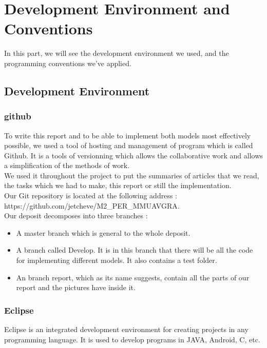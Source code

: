 \chapter{Development Environment and Conventions}

In this part, we will see the development environment we used, and the programming conventions we've applied.

\section{Development Environment}

\subsection{github}

To write this report and to be able to implement both models most effectively possible, we used a tool of hosting and management of program which is called Github. It is a tools of versionning which allows the collaborative work and allows a simplification of the methods of work.\\
We used it throughout the project to put the summaries of articles that we read, the tasks which we had to make, this report or still the implementation.\\
Our Git repository is located at the following address : \\
https://github.com/jetcheve/M2\_PER\_MMUAVGRA.\\

Our deposit decomposes into three branches :

\begin{itemize}
\item A master branch which is general to the whole deposit.
\item A branch called Develop. It is in this branch that there will be all the code for implementing different models. It also contains a test folder. 
\item An branch report, which as its name suggests, contain all the parts of our report and the pictures have inside it.
\end{itemize}

\subsection{Eclipse}

Eclipse is an integrated development environment for creating projects in any programming language. It is used to develop programs in JAVA, Android, C, etc.\\

